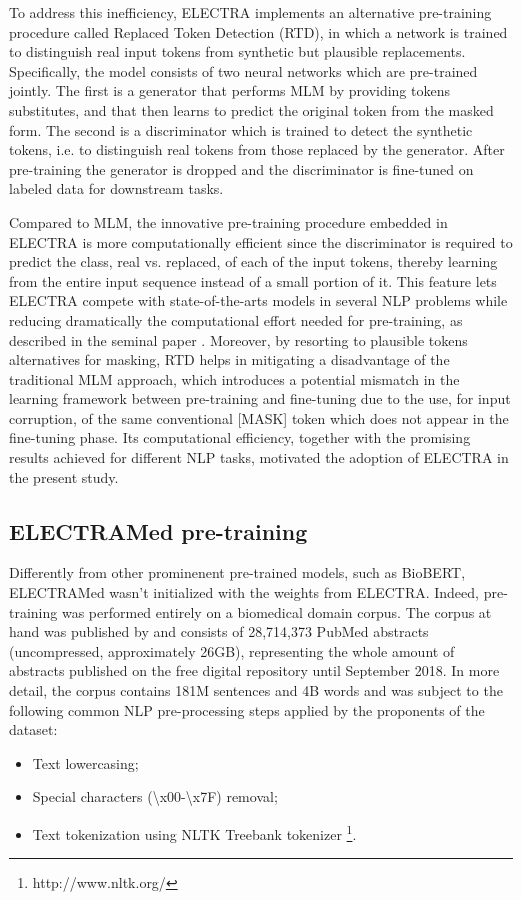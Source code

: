 \documentclass{article}
\begin{document}
To address this inefficiency, ELECTRA implements an alternative pre-training procedure called Replaced Token Detection (RTD), in which a network is trained to distinguish real input tokens from synthetic but plausible replacements.
Specifically, the model consists of two neural networks which are pre-trained jointly. 
The first is a generator that performs MLM by providing tokens substitutes, and that then learns to predict the original token from the masked form. The second is a discriminator which is trained to detect the synthetic tokens, i.e. to distinguish real tokens from those replaced by the generator.
After pre-training the generator is dropped and the discriminator is fine-tuned on labeled data for downstream tasks.

Compared to MLM, the innovative pre-training procedure embedded in ELECTRA is more computationally efficient since the discriminator is required to predict the class, real vs. replaced, of each of the input tokens, thereby learning from the entire input sequence instead of a small portion of it.
This feature lets ELECTRA compete with state-of-the-arts models in several NLP problems while reducing dramatically the computational effort needed for pre-training, as described in the seminal paper \citep{Clark20}. Moreover, by resorting to plausible tokens alternatives for masking, RTD helps in mitigating a disadvantage of the traditional MLM approach, which introduces a potential mismatch in the learning framework between pre-training and fine-tuning due to the use, for input corruption, of the same conventional [MASK] token which does not appear in the fine-tuning phase.
Its computational efficiency, together with the promising results achieved for different NLP tasks, motivated the adoption of ELECTRA in the present study.

\subsection{ELECTRAMed pre-training}
Differently from other prominenent pre-trained models, such as BioBERT, ELECTRAMed wasn't initialized with the weights from ELECTRA.
Indeed, pre-training was performed entirely on a biomedical domain corpus.
The corpus at hand was published by \citep{Peng19} and consists of 28,714,373 PubMed abstracts (uncompressed, approximately 26GB), representing the whole amount of abstracts published on the free digital repository until September 2018.
In more detail, the corpus contains 181M sentences and 4B words and was subject to the following common NLP pre-processing steps applied by the  proponents of the dataset:
\begin{itemize}
    \item Text lowercasing;
    \item Special characters (\textbackslash x00-\textbackslash x7F) removal;
    \item Text tokenization using NLTK Treebank tokenizer \footnote{http://www.nltk.org/}.
\end{itemize}
\end{document}
